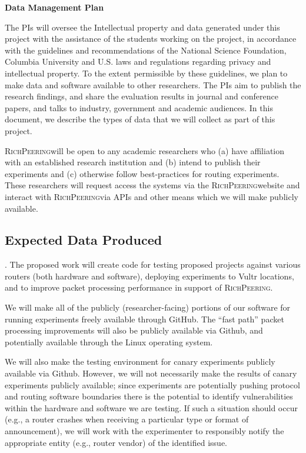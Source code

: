 \documentclass[11pt]{article}
\newcommand{\sys}{{\textsc{RichPeering}\xspace}}
\newcommand{\parai}[1]{\smallskip\noindent{\textit {#1}}}
\begin{document}
\begin{center}
{\LARGE \textbf{Data Management Plan}}
\end{center}

\bigskip
\par

The PIs will oversee the Intellectual property and data generated under this project with the assistance of the students working on the project, in accordance with the guidelines and recommendations of the National Science Foundation, Columbia University and U.S. laws and regulations regarding privacy and intellectual property.
To the extent permissible by these guidelines, we plan to make data and software available to other researchers. The PIs aim to publish the research findings, and share the evaluation results in journal and conference papers, and talks to industry, government and academic audiences. In this document, we describe the types of data that we will collect as part of this project. 

\sys will be open to any academic researchers  who (a) have affiliation with an established research institution and (b) intend to publish their experiments and (c) otherwise follow best-practices for routing experiments. These researchers will request access the systems via the \sys website and interact with \sys via APIs and other means which we will make publicly available.  

\subsection*{Expected Data Produced}


\parai{Software and code}.  The proposed work will create code for testing proposed projects against various routers (both hardware and software), deploying experiments to Vultr locations, and to improve packet processing performance in support of \sys.  

We will make all of the  publicly (researcher-facing) portions of our software for running experiments freely available through GitHub.  The ``fast path'' packet processing improvements will also be publicly available via Github, and potentially available through the Linux operating system.

We will also make the testing environment for canary experiments publicly available via Github.  However, we will not necessarily make the results of canary experiments publicly available; since experiments are potentially pushing protocol and routing software boundaries there is the potential to identify vulnerabilities within the hardware and software we are testing.  If such a situation should occur (e.g., a router crashes when receiving a particular type or format of announcement), we will work with the experimenter to responsibly notify the appropriate entity (e.g., router vendor) of the identified issue.
\end{document}
